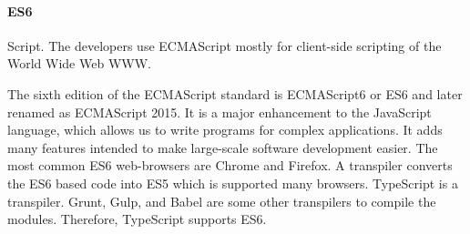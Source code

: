 \paragraph{ES6}
Script. The developers use ECMAScript mostly for client-side scripting of the World Wide Web \ac{WWW}.

The sixth edition of the ECMAScript standard is ECMAScript6 or ES6 and later renamed as ECMAScript 2015. It is a major enhancement to the JavaScript language, which allows us to write programs for complex applications. It adds many features intended to make large-scale software development easier. The most common ES6 web-browsers are Chrome and Firefox. A transpiler converts the ES6 based code into ES5 which is supported many browsers. TypeScript is a transpiler. Grunt, Gulp, and Babel are some other transpilers to compile the modules. Therefore, TypeScript supports ES6.







